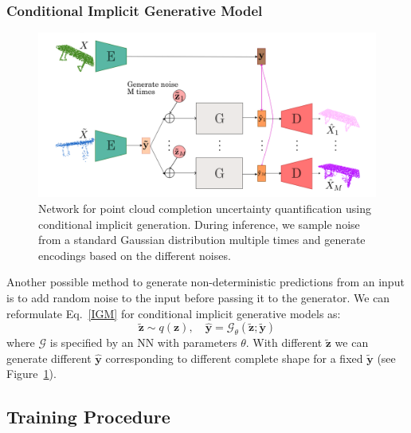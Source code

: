         \subsubsection{Conditional Implicit Generative Model}
        \begin{figure}[htb]
          \begin{center}
          \includegraphics[width=\linewidth]{figures/implicit_gen_network.png}
          \end{center}
          \caption{Network for point cloud completion uncertainty quantification using conditional implicit generation. During inference, we sample noise from a standard Gaussian distribution multiple times and generate encodings based on the different noises.}\label{fig:implicit_net}
        \end{figure}
        Another possible method to generate non-deterministic predictions from an input is to add random noise to the input before passing it to the generator. We can reformulate Eq.~\ref{IGM} for conditional implicit generative models as:
        \begin{equation}\label{IGM}
            \mathbf{\tilde{z}} \sim q(\mathbf{z}), \quad \mathbf{\hat{y}} =  \mathcal{G}_\theta(\mathbf{\tilde{z}}; \mathbf{\tilde{y}})
        \end{equation}
        where $\mathcal{G}$ is specified by an NN with parameters $\theta$. With different $\mathbf{\tilde{z}}$ we can generate different $\mathbf{\hat{y}}$ corresponding to different complete shape for a fixed $\mathbf{\tilde{y}}$ (see Figure~\ref{fig:implicit_net}).

    \subsection{Training Procedure}
